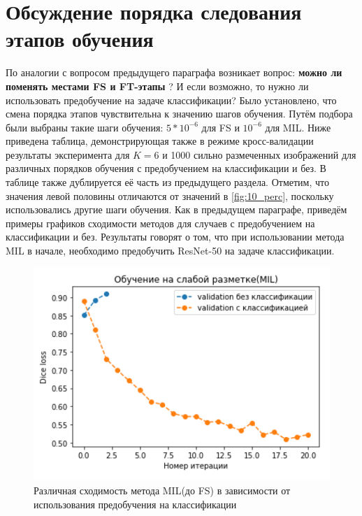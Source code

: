 \section{Обсуждение порядка следования этапов обучения}
По аналогии с вопросом предыдущего параграфа  возникает вопрос:  {\bf можно ли поменять местами FS и FT-этапы} ? И если возможно, то нужно ли использовать предобучение на задаче классификации? Было установлено, что смена порядка этапов чувствительна к значению шагов обучения. Путём подбора были выбраны такие шаги обучения: $5*10^{-6}$ для FS и $10^{-6}$ для MIL. Ниже приведена таблица, демонстрирующая также в режиме кросс-валидации результаты эксперимента для $K = 6$ и 1000 сильно размеченных изображений для различных порядков обучения с предобучением на классификации и без. В таблице также дублируется её часть из предыдущего раздела. Отметим, что значения левой половины отличаются от значений  в \ref{fig:10_perc}, поскольку использовались другие шаги обучения.  Как в предыдущем параграфе, приведём примеры графиков сходимости методов для случаев с предобучением на классификации и без. Результаты говорят о том, что при использовании метода MIL в начале, необходимо предобучить ResNet-50 на задаче классификации.


\begin{figure}[h!] 
  \center
  \includegraphics [scale=0.7] {images/cmp_order_mil.png}
  \caption{ Различная сходимость метода MIL(до FS) в зависимости от использования предобучения на классификации }
  \label{fig:mil_order}  
\end{figure}

